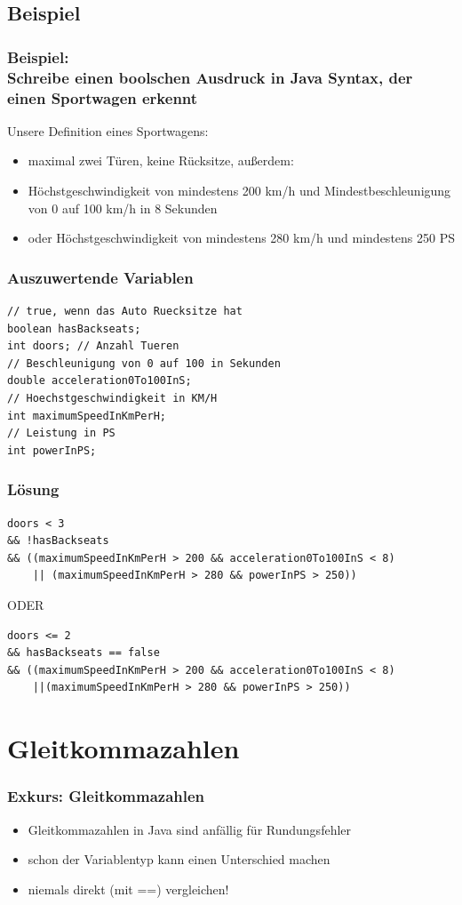 \documentclass[final]{beamer}
\begin{document}
\subsection{Beispiel}
\begin{frame}
	\frametitle{Beispiel: \\Schreibe einen boolschen Ausdruck in Java Syntax, der einen Sportwagen erkennt}
	Unsere Definition eines Sportwagens:	\\
	\begin{itemize}
		\item{maximal zwei Türen, keine Rücksitze, außerdem:}
		\item{Höchstgeschwindigkeit von mindestens 200 km/h und  Mindestbeschleunigung von 0 auf 100 km/h in 8 Sekunden}
		\item{oder Höchstgeschwindigkeit von mindestens 280 km/h und mindestens 250 PS}
	\end{itemize}
\end{frame}

\begin{frame}[containsverbatim]
	\frametitle{Auszuwertende Variablen}
	\begin{lstlisting}
// true, wenn das Auto Ruecksitze hat
boolean hasBackseats;
int doors; // Anzahl Tueren
// Beschleunigung von 0 auf 100 in Sekunden
double acceleration0To100InS;
// Hoechstgeschwindigkeit in KM/H
int maximumSpeedInKmPerH;
// Leistung in PS
int powerInPS;
	\end{lstlisting}
\end{frame}

\begin{frame}[containsverbatim]
	\frametitle{Lösung}
\begin{lstlisting}
doors < 3
&& !hasBackseats
&& ((maximumSpeedInKmPerH > 200 && acceleration0To100InS < 8)
	|| (maximumSpeedInKmPerH > 280 && powerInPS > 250))
\end{lstlisting}
\vfill
ODER
\vfill
\begin{lstlisting}
doors <= 2
&& hasBackseats == false
&& ((maximumSpeedInKmPerH > 200 && acceleration0To100InS < 8)
	||(maximumSpeedInKmPerH > 280 && powerInPS > 250))
\end{lstlisting}

\end{frame}

\section{Gleitkommazahlen}
\begin{frame}
	\frametitle{Exkurs: Gleitkommazahlen}
	\begin{itemize}
		\item{Gleitkommazahlen in Java sind anfällig für Rundungsfehler}
		\item{schon der Variablentyp kann einen Unterschied machen}
		\item{niemals direkt (mit ==) vergleichen!}
	\end{itemize}
\end{frame}
\end{document}
